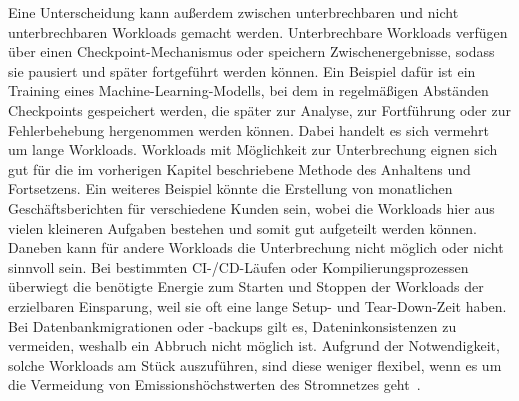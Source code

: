 Eine Unterscheidung kann außerdem zwischen unterbrechbaren und nicht unterbrechbaren Workloads gemacht werden.
Unterbrechbare Workloads verfügen über einen Checkpoint-Mechanismus oder speichern Zwischenergebnisse, sodass sie pausiert und später fortgeführt werden können.
Ein Beispiel dafür ist ein Training eines Machine-Learning-Modells, bei dem in regelmäßigen Abständen Checkpoints gespeichert werden, die später zur Analyse, zur Fortführung oder zur Fehlerbehebung hergenommen werden können.
Dabei handelt es sich vermehrt um lange Workloads.
Workloads mit Möglichkeit zur Unterbrechung eignen sich gut für die im vorherigen Kapitel beschriebene Methode des Anhaltens und Fortsetzens.
Ein weiteres Beispiel könnte die Erstellung von monatlichen Geschäftsberichten für verschiedene Kunden sein, wobei die Workloads hier aus vielen kleineren Aufgaben bestehen und somit gut aufgeteilt werden können.
Daneben kann für andere Workloads die Unterbrechung nicht möglich oder nicht sinnvoll sein.
Bei bestimmten CI-/CD-Läufen oder Kompilierungsprozessen überwiegt die benötigte Energie zum Starten und Stoppen der Workloads der erzielbaren Einsparung, weil sie oft eine lange Setup- und Tear-Down-Zeit haben.
Bei Datenbankmigrationen oder -backups gilt es, Dateninkonsistenzen zu vermeiden, weshalb ein Abbruch nicht möglich ist.
Aufgrund der Notwendigkeit, solche Workloads am Stück auszuführen, sind diese weniger flexibel, wenn es um die Vermeidung von Emissionshöchstwerten des Stromnetzes geht~\cite{Wiesner.2021}.


